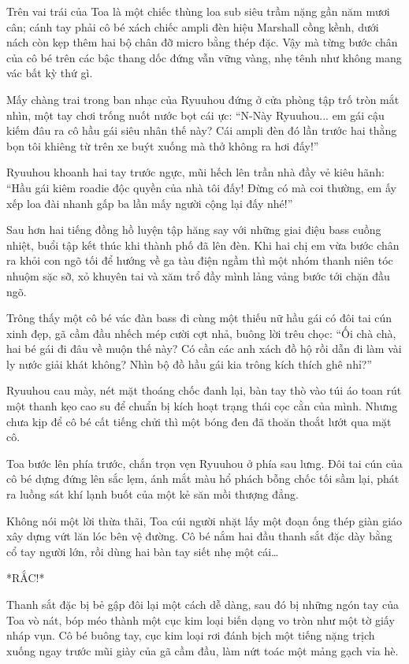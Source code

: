 \documentclass[../main.tex]{subfiles}
\begin{document}
Trên vai trái của Toa là một chiếc thùng loa sub siêu trầm nặng gần năm mươi cân; cánh tay phải cô bé xách chiếc ampli đèn hiệu Marshall cồng kềnh, dưới nách còn kẹp thêm hai bộ chân đỡ micro bằng thép đặc. Vậy mà từng bước chân của cô bé trên các bậc thang dốc đứng vẫn vững vàng, nhẹ tênh như không mang vác bất kỳ thứ gì.

Mấy chàng trai trong ban nhạc của Ryuuhou đứng ở cửa phòng tập trố tròn mắt nhìn, một tay chơi trống nuốt nước bọt cái ực: ``N-Này Ryuuhou... em gái cậu kiếm đâu ra cô hầu gái siêu nhân thế này? Cái ampli đèn đó lần trước hai thằng bọn tôi khiêng từ trên xe buýt xuống mà thở không ra hơi đấy!''

Ryuuhou khoanh hai tay trước ngực, mũi hếch lên trần nhà đầy vẻ kiêu hãnh: ``Hầu gái kiêm roadie độc quyền của nhà tôi đấy! Đừng có mà coi thường, em ấy xếp loa đài nhanh gấp ba lần mấy người cộng lại đấy nhé!''

Sau hơn hai tiếng đồng hồ luyện tập hăng say với những giai điệu bass cuồng nhiệt, buổi tập kết thúc khi thành phố đã lên đèn. Khi hai chị em vừa bước chân ra khỏi con ngõ tối để hướng về ga tàu điện ngầm thì một nhóm thanh niên tóc nhuộm sặc sỡ, xỏ khuyên tai và xăm trổ đầy mình lảng vảng bước tới chặn đầu ngõ.

Trông thấy một cô bé vác đàn bass đi cùng một thiếu nữ hầu gái có đôi tai cún xinh đẹp, gã cầm đầu nhếch mép cười cợt nhả, buông lời trêu chọc: ``Ối chà chà, hai bé gái đi đâu về muộn thế này? Có cần các anh xách đồ hộ rồi dẫn đi làm vài ly nước giải khát không? Nhìn bộ đồ hầu gái kia trông kích thích ghê nhỉ?''

Ryuuhou cau mày, nét mặt thoáng chốc đanh lại, bàn tay thò vào túi áo toan rút một thanh kẹo cao su để chuẩn bị kích hoạt trạng thái cọc cằn của mình. Nhưng chưa kịp để cô bé cất tiếng chửi thì một bóng đen đã thoăn thoắt lướt qua mặt cô.

Toa bước lên phía trước, chắn trọn vẹn Ryuuhou ở phía sau lưng. Đôi tai cún của cô bé dựng đứng lên sắc lẹm, ánh mắt màu hổ phách bỗng chốc tối sầm lại, phát ra luồng sát khí lạnh buốt của một kẻ săn mồi thượng đẳng.

Không nói một lời thừa thãi, Toa cúi người nhặt lấy một đoạn ống thép giàn giáo xây dựng vứt lăn lóc bên vệ đường. Cô bé nắm hai đầu thanh sắt đặc dày bằng cổ tay người lớn, rồi dùng hai bàn tay siết nhẹ một cái\dots

*RẮC!*

Thanh sắt đặc bị bẻ gập đôi lại một cách dễ dàng, sau đó bị những ngón tay của Toa vò nát, bóp méo thành một cục kim loại biến dạng vo tròn như một tờ giấy nháp vụn. Cô bé buông tay, cục kim loại rơi đánh bịch một tiếng nặng trịch xuống ngay trước mũi giày của gã cầm đầu, làm nứt toác một mảng gạch vỉa hè.
\end{document}
